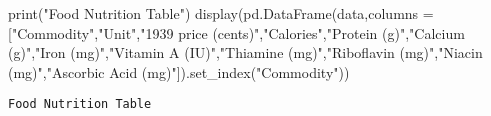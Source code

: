 \documentclass[
  ignorenonframetext,
]{beamer}
\newenvironment{Shaded}{\begin{snugshade}}{\end{snugshade}}
\newcommand{\BuiltInTok}[1]{\textcolor[rgb]{0.00,0.23,0.31}{#1}}
\newcommand{\NormalTok}[1]{\textcolor[rgb]{0.00,0.23,0.31}{#1}}
\newcommand{\OperatorTok}[1]{\textcolor[rgb]{0.37,0.37,0.37}{#1}}
\newcommand{\StringTok}[1]{\textcolor[rgb]{0.13,0.47,0.30}{#1}}
\begin{document}
\begin{frame}[fragile]
\begin{Shaded}
\begin{Highlighting}[]
\BuiltInTok{print}\NormalTok{(}\StringTok{"Food Nutrition Table"}\NormalTok{)}
\NormalTok{display(pd.DataFrame(data,columns }\OperatorTok{=}\NormalTok{ [}\StringTok{"Commodity"}\NormalTok{,}\StringTok{"Unit"}\NormalTok{,}\StringTok{"1939 price (cents)"}\NormalTok{,}\StringTok{"Calories"}\NormalTok{,}\StringTok{"Protein (g)"}\NormalTok{,}\StringTok{"Calcium (g)"}\NormalTok{,}\StringTok{"Iron (mg)"}\NormalTok{,}\StringTok{"Vitamin A (IU)"}\NormalTok{,}\StringTok{"Thiamine (mg)"}\NormalTok{,}\StringTok{"Riboflavin (mg)"}\NormalTok{,}\StringTok{"Niacin (mg)"}\NormalTok{,}\StringTok{"Ascorbic Acid (mg)"}\NormalTok{]).set\_index(}\StringTok{"Commodity"}\NormalTok{))}
\end{Highlighting}
\end{Shaded}

\begin{verbatim}
Food Nutrition Table
\end{verbatim}


\end{frame}
\end{document}
